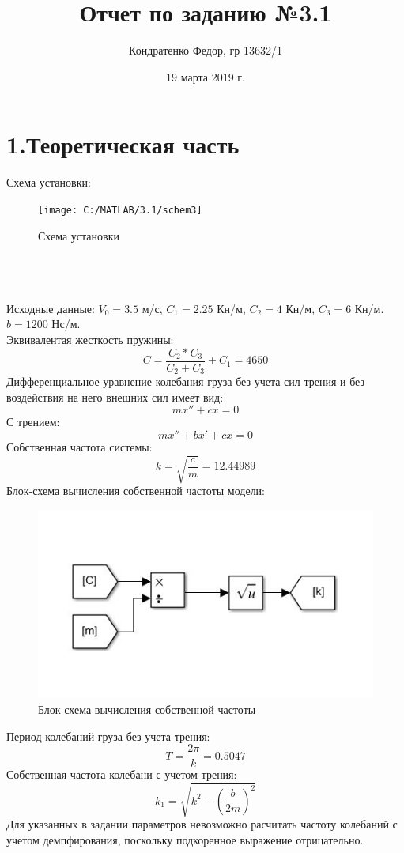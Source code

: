 \documentclass{article}
\date{19 марта 2019 г.}
\author{Кондратенко Федор, гр 13632/1}
\title{Отчет по заданию №3.1}
\begin{document}
	\maketitle
	\section*{1.Теоретическая часть}
	Схема установки:
	\begin{figure}[h]
		\centering
		\texttt{[image: C:/MATLAB/3.1/schem3]}
		\caption{Схема установки}

	\end{figure}
	~\\
	~\\\\
	Исходные данные:
	$V_0=3.5$ м/с,
	$C_1=2.25$ Кн/м,
	$C_2=4$ Кн/м,
	$C_3=6$ Кн/м.
	$b=1200$ Нс/м.
	~\\
	Эквивалентая жесткость пружины:
	$$C=\frac{C_2*C_3}{C_2+C_3}+C_1=4650$$
	Дифференциальное уравнение колебания груза без учета сил трения и без воздействия на него внешних сил имеет вид:
	$$mx''+cx=0$$
	С трением:
	$$mx''+bx'+cx=0$$
	Собственная частота системы:
	$$k=\sqrt{\frac{c}{m}}=12.44989$$
	Блок-схема вычисления собственной частоты модели:
	\begin{figure}
		\centering
		\includegraphics[width=0.7\linewidth]{schem5}
		\caption{Блок-схема вычисления собственной частоты}

	\end{figure}
	Период колебаний груза без учета трения:
	$$T=\frac{2\pi}{k}=0.5047$$
	Собственная частота колебани с учетом трения:
	$$k_1=\sqrt{k^2-(\frac{b}{2m})^2}$$
	Для указанных в задании параметров невозможно расчитать частоту колебаний с учетом демпфирования, поскольку подкоренное выражение отрицательно. 
\end{document}

